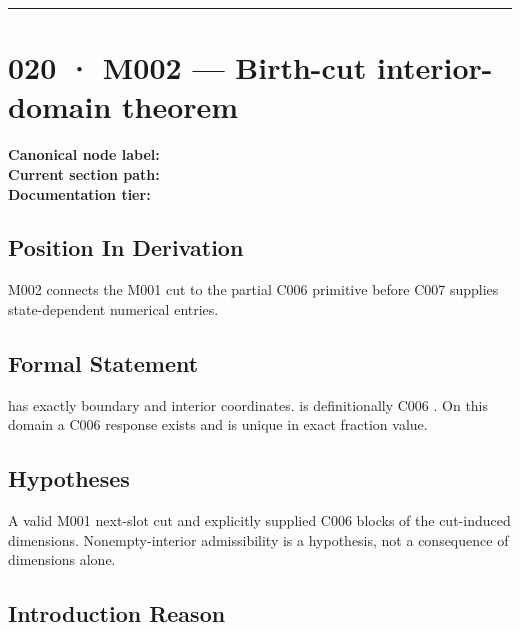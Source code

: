 \begin{center}\rule{0.5\linewidth}{0.5pt}\end{center}

\section{020 · M002 --- Birth-cut interior-domain
theorem}\label{m002-birth-cut-interior-domain-theorem}

\textbf{Canonical node label:} \texttt{\protect{}}\\
\textbf{Current section path:} \texttt{\protect{}}\\
\textbf{Documentation tier:} \texttt{\protect{}}

\subsection{Position In Derivation}\label{position-in-derivation-16}

M002 connects the M001 cut to the partial C006 primitive before C007
supplies state-dependent numerical entries.

\subsection{Formal Statement}\label{formal-statement-6}

\texttt{\protect{}} has exactly
\texttt{\protect{}} boundary and
\texttt{\protect{}} interior coordinates.
\texttt{\protect{}} is definitionally C006
\texttt{\protect{}}. On this domain a C006 response
exists and is unique in exact fraction value.

\subsection{Hypotheses}\label{hypotheses-6}

A valid M001 next-slot cut and explicitly supplied C006 blocks of the
cut-induced dimensions. Nonempty-interior admissibility is a hypothesis,
not a consequence of dimensions alone.

\subsection{Introduction Reason}\label{introduction-reason-19}

